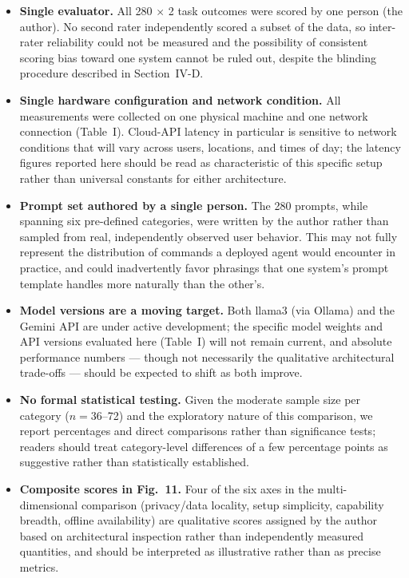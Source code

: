\documentclass[conference]{IEEEtran}
\begin{document}
\begin{itemize}
\item \textbf{Single evaluator.} All 280 $\times$ 2 task outcomes were scored by one person (the author). No second rater independently scored a subset of the data, so inter-rater reliability could not be measured and the possibility of consistent scoring bias toward one system cannot be ruled out, despite the blinding procedure described in Section~IV-D.
\item \textbf{Single hardware configuration and network condition.} All measurements were collected on one physical machine and one network connection (Table~I). Cloud-API latency in particular is sensitive to network conditions that will vary across users, locations, and times of day; the latency figures reported here should be read as characteristic of this specific setup rather than universal constants for either architecture.
\item \textbf{Prompt set authored by a single person.} The 280 prompts, while spanning six pre-defined categories, were written by the author rather than sampled from real, independently observed user behavior. This may not fully represent the distribution of commands a deployed agent would encounter in practice, and could inadvertently favor phrasings that one system's prompt template handles more naturally than the other's.
\item \textbf{Model versions are a moving target.} Both llama3 (via Ollama) and the Gemini API are under active development; the specific model weights and API versions evaluated here (Table~I) will not remain current, and absolute performance numbers --- though not necessarily the qualitative architectural trade-offs --- should be expected to shift as both improve.
\item \textbf{No formal statistical testing.} Given the moderate sample size per category ($n = 36$--72) and the exploratory nature of this comparison, we report percentages and direct comparisons rather than significance tests; readers should treat category-level differences of a few percentage points as suggestive rather than statistically established.
\item \textbf{Composite scores in Fig.~11.} Four of the six axes in the multi-dimensional comparison (privacy/data locality, setup simplicity, capability breadth, offline availability) are qualitative scores assigned by the author based on architectural inspection rather than independently measured quantities, and should be interpreted as illustrative rather than as precise metrics.
\end{itemize}
\end{document}
